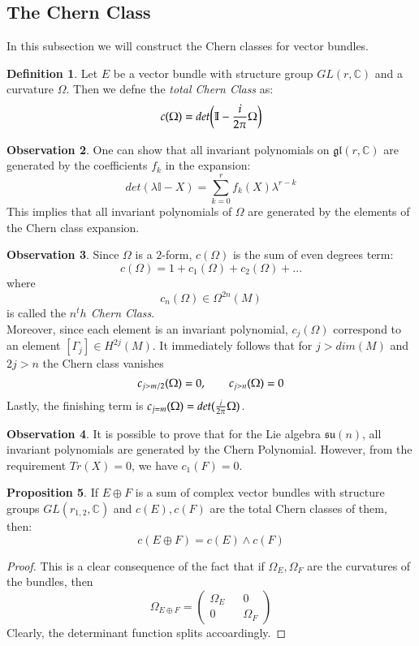 \documentclass[12pt,a4paper]{report}
\theoremstyle{definition}
\newtheorem{Def}{Definition}[chapter]
\theoremstyle{Theorem}
\newtheorem{Prop}[Def]{Proposition}
\theoremstyle{break}
\theoremstyle{definition}
\newtheorem{Obs}[Def]{Observation}
\begin{document}
	\subsection{The Chern Class}
	In this subsection we will construct the Chern classes for vector bundles.
	\begin{Def}
		Let $E$ be a vector bundle with structure group $GL(r,\mathbb{C})$ and a curvature $\Omega$. Then we defne the \textit{total Chern Class} as:
		$$c(\Omega)=det\bigg(\mathbb{I}-{i\over 2\pi}\Omega\bigg)$$ 
	\end{Def}
	\begin{Obs}
		One can show that all invariant polynomials on $\mathfrak{gl}(r,\mathbb{C})$ are generated by the coefficients $f_k$ in the expansion:
		$$det(\lambda\mathbb{I}-X)=\sum_{k=0}^r f_k(X)\lambda^{r-k}$$
		This implies that all invariant polynomials of $\Omega$ are generated by the elements of the Chern class expansion.
	\end{Obs}
	\begin{Obs}
		Since $\Omega$ is a $2$-form, $c(\Omega)$ is the sum of even degrees term:
		$$c(\Omega)=1+c_1(\Omega)+c_2(\Omega)+...$$
		where $$c_n(\Omega)\in\Omega^{2n}(M)$$
		is called the \textit{$n^th$ Chern Class}.\\
		Moreover, since each element is an invariant polynomial, $c_j(\Omega)$ correspond to an element $[\Gamma_j]\in H^{2j}(M)$. It immediately follows that for $j>dim(M)$ and $2j>n$ the Chern class vanishes 
		$$c_{j>m/2}(\Omega)=0,\hspace{20 pt}c_{j>n}(\Omega)=0$$
		Lastly, the finishing term is $c_{j=m}(\Omega)=det({i\over 2\pi}\Omega)$.
	\end{Obs}
	\begin{Obs}
		It is possible to prove that for the Lie algebra $\mathfrak{su}(n)$, all invariant polynomials are generated by the Chern Polynomial. However, from the requirement $Tr(X)=0$, we have $c_1(F)=0$.
	\end{Obs}
	\begin{Prop}
		If $E\oplus F$ is a sum of complex vector bundles with structure groups $GL(r_{1,2},\mathbb{C})$ and $c(E),c(F)$ are the total Chern classes of them, then:
		$$c(E\oplus F)=c(E)\wedge c(F)$$
	\end{Prop}
	\begin{proof}
		This is a clear consequence of the fact that if $\Omega_E,\Omega_F$ are the curvatures of the bundles, then $$\Omega_{E\oplus F}=\begin{pmatrix}
		\Omega_E && 0\\
		0&& \Omega_F
		\end{pmatrix}$$
		Clearly, the determinant function splits accoardingly.
	\end{proof}
\end{document}
